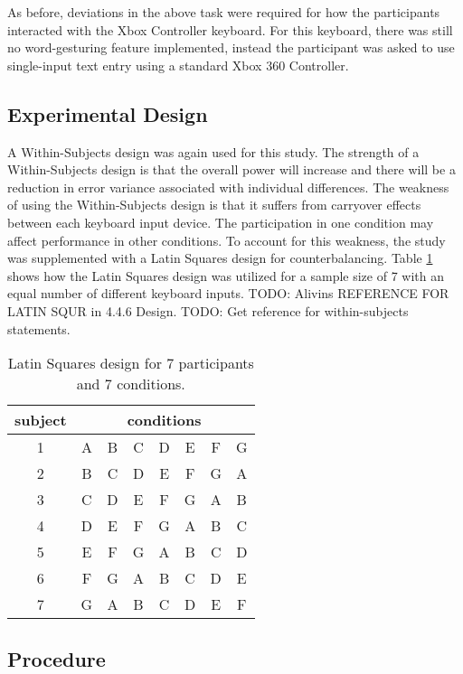 As before, deviations in the above task were required for how the participants interacted with the Xbox Controller keyboard. For this keyboard, there was still no word-gesturing feature implemented, instead the participant was asked to use single-input text entry using a standard Xbox 360 Controller.

\subsection{Experimental Design} \label{pilot_experimental_design}

A Within-Subjects design was again used for this study. The strength of a Within-Subjects design is that the overall power will increase and there will be a reduction in error variance associated with individual differences. The weakness of using the Within-Subjects design is that it suffers from carryover effects between each keyboard input device. The participation in one condition may affect performance in other conditions. To account for this weakness, the study was supplemented with a Latin Squares design for counterbalancing. Table \ref{pilot_latin_squares} shows how the Latin Squares design was utilized for a sample size of 7 with an equal number of different keyboard inputs. TODO: Alivins REFERENCE FOR LATIN SQUR in 4.4.6 Design. TODO: Get reference for within-subjects statements.

\begin{table}[h] %
	\centering
	\caption[Latin Squares Design Rep 1]{\centering Latin Squares design for 7 participants and 7 conditions.}
	\label{pilot_latin_squares}
	\begin{tabular}{c | c c c c c c c}
		\hline
		subject & \multicolumn{7}{c}{conditions} \\
		\hline
		1 & A & B & C & D & E & F & G \\
		2 & B & C & D & E & F & G & A \\
		3 & C & D & E & F & G & A & B \\
		4 & D & E & F & G & A & B & C \\
		5 & E & F & G & A & B & C & D \\
		6 & F & G & A & B & C & D & E \\
		7 & G & A & B & C & D & E & F \\
		\hline
	\end{tabular}
\end{table}

\subsection{Procedure} \label{pilot_procedure}

